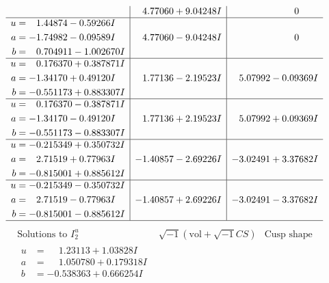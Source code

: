 \documentclass[1p]{elsarticle_modified}
\theoremstyle{definition}
\newcommand{\I}{\sqrt{-1}}
\begin{document}
$$\begin{array}{c|c|c}
 & \phantom{-}4.77060 + 9.04248 I & \phantom{-0.000000 } 0 \\ \hline\begin{aligned}
u &= \phantom{-}1.44874 - 0.59266 I \\
a &= -1.74982 - 0.09589 I \\
b &= \phantom{-}0.704911 - 1.002670 I\end{aligned}
 & \phantom{-}4.77060 - 9.04248 I & \phantom{-0.000000 } 0 \\ \hline\begin{aligned}
u &= \phantom{-}0.176370 + 0.387871 I \\
a &= -1.34170 + 0.49120 I \\
b &= -0.551173 + 0.883307 I\end{aligned}
 & \phantom{-}1.77136 - 2.19523 I & \phantom{-}5.07992 - 0.09369 I \\ \hline\begin{aligned}
u &= \phantom{-}0.176370 - 0.387871 I \\
a &= -1.34170 - 0.49120 I \\
b &= -0.551173 - 0.883307 I\end{aligned}
 & \phantom{-}1.77136 + 2.19523 I & \phantom{-}5.07992 + 0.09369 I \\ \hline\begin{aligned}
u &= -0.215349 + 0.350732 I \\
a &= \phantom{-}2.71519 + 0.77963 I \\
b &= -0.815001 + 0.885612 I\end{aligned}
 & -1.40857 - 2.69226 I & -3.02491 + 3.37682 I \\ \hline\begin{aligned}
u &= -0.215349 - 0.350732 I \\
a &= \phantom{-}2.71519 - 0.77963 I \\
b &= -0.815001 - 0.885612 I\end{aligned}
 & -1.40857 + 2.69226 I & -3.02491 - 3.37682 I\\
 \hline 
 \end{array}$$\newpage$$\begin{array}{c|c|c}  
\text{Solutions to }I^u_{2}& \I (\text{vol} + \sqrt{-1}CS) & \text{Cusp shape}\\
 \hline 
\begin{aligned}
u &= \phantom{-}1.23113 + 1.03828 I \\
a &= \phantom{-}1.050780 + 0.179318 I \\
b &= -0.538363 + 0.666254 I\end{aligned}

\end{array}$$
\end{document}
